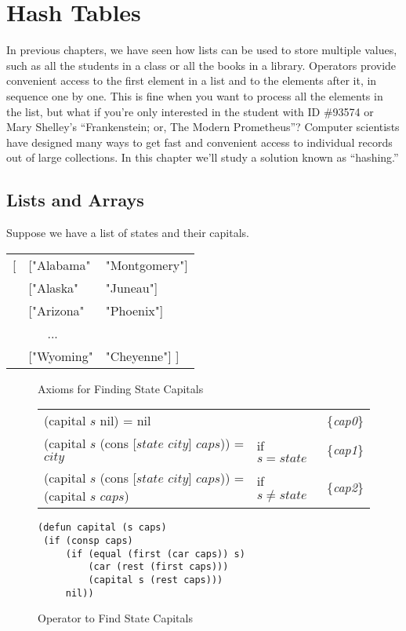 \chapter{Hash Tables}
\label{ch:hash-tables}

In previous chapters, we have seen how lists can be used to store
multiple values, such as all the students in a class or all the books
in a library. Operators provide convenient access to the first element
in a list and to the elements after it, in sequence one by one.
This is fine when you want to
process all the elements in the list, but what if you're only interested
in the student with ID \#93574 or Mary Shelley's ``Frankenstein; or,
The Modern Prometheus''?
Computer scientists have designed many
ways to get fast and convenient access
to individual records out of large collections.
In this chapter we'll study a solution known as ``hashing.''

\section{Lists and Arrays}

Suppose we have a list of states and their 
\label{states-capitals-list}capitals.
\begin{center}
\begin{tabular}{lll}
\textsf{[} &\textsf{["Alabama"}  &\textsf{"Montgomery"]}\\
  &\textsf{["Alaska"}   &\textsf{"Juneau"]}\\
  &\textsf{["Arizona"}  &\textsf{"Phoenix"]}\\
  &~~~...      &\\
  &\textsf{["Wyoming"}  &\textsf{"Cheyenne"] ]}\\
\end{tabular}
\end{center}

\begin{figure}
\begin{center}
Axioms for Finding State Capitals
\begin{tabular}{lll}
(capital $s$ nil) = nil                               &             & \{\emph{cap0}\} \\
(capital $s$ (cons [$state$ $city$] $caps$)) = $city$ &if $s=state$ & \{\emph{cap1}\} \\
(capital $s$ (cons [$state$ $city$] $caps$)) = (capital $s$ $caps$) & if $s \neq state$ & \{\emph{cap2}\} \\
\end{tabular}
\begin{Verbatim}
(defun capital (s caps)
 (if (consp caps)
     (if (equal (first (car caps)) s)
         (car (rest (first caps)))
         (capital s (rest caps)))
     nil))
\end{Verbatim}
\caption{Operator to Find State Capitals}
\label{fig:state-capital-operator}
\end{center}
\end{figure}

